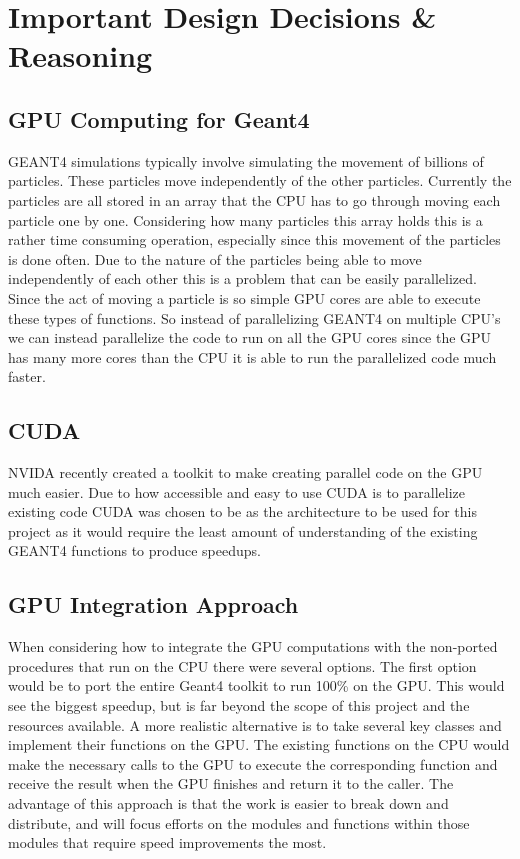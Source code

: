 \documentclass[12pt]{article}
\begin{document}
\section{Important Design Decisions \& Reasoning}
\subsection{GPU Computing for Geant4}
GEANT4 simulations typically involve simulating the movement of billions of particles. These particles move independently of the other particles. Currently the particles are all stored in an array that the CPU has to go through moving each particle one by one. Considering how many particles this array holds this is a rather time consuming operation, especially since this movement of the particles is done often. 
Due to the nature of the particles being able to move independently of each other this is a problem that can be easily parallelized. Since the act of moving a particle is so simple GPU cores are able to execute these types of functions. So instead of parallelizing GEANT4 on multiple CPU's we can instead parallelize the code to run on all the GPU cores since the GPU has many more cores than the CPU it is able to run the parallelized code much faster.

\subsection{CUDA}
NVIDA recently created a toolkit to make creating parallel code on the GPU much easier. Due to how accessible and easy to use CUDA is to parallelize existing code CUDA was chosen to be as the architecture to be used for this project as it would require the least amount of understanding of the existing GEANT4 functions to produce speedups. 

\subsection{GPU Integration Approach} %
When considering how to integrate the GPU computations with the non-ported procedures that run on the CPU there were several options. The first option would be to port the entire Geant4 toolkit to run 100\% on the GPU. This would see the biggest speedup, but is far beyond the scope of this project and the resources available. A more realistic alternative is to take several key classes and implement their functions on the GPU. The existing functions on the CPU would make the necessary calls to the GPU to execute the corresponding function and receive the result when the GPU finishes and return it to the caller. The advantage of this approach is that the work is easier to break down and distribute, and will focus efforts on the modules and functions within those modules that require speed improvements the most.\\
\end{document}
